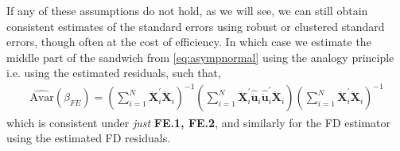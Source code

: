 If any of these assumptions do not hold, as we will see, we can still obtain consistent estimates of the standard errors using robust or clustered standard errors, though often at the cost of efficiency. In which case we estimate the middle part of the sandwich from \eqref{eq:asympnormal} using the analogy principle i.e. using the estimated residuals, such that, 
\begin{align*}
    \hat{\text{Avar}}(\hat{\beta}_{FE}) = \left( \sum_{i=1}^N \bm{\ddot{X}}_i^\prime \bm{\ddot{X}}_i \right)^{-1} \left( \sum_{i=1}^N \bm{\ddot{X}}_i^\prime \hat{\ddot{\bm{u}}}_i \hat{\ddot{\bm{u}}}_i^\prime \bm{\ddot{X}}_i \right) \left( \sum_{i=1}^N \bm{\ddot{X}}_i^\prime \bm{\ddot{X}}_i \right)^{-1}
\end{align*} 
which is consistent under \textit{just} \textbf{FE.1, FE.2}, and similarly for the FD estimator using the estimated FD residuals.